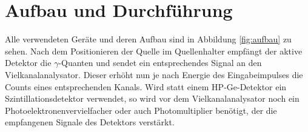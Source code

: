 \section{Aufbau und Durchführung}
\label{sec:aufbau}
\FloatBarrier

	Alle verwendeten Geräte und deren Aufbau sind in Abbildung \ref{fig:aufbau} zu sehen.
	Nach dem Positionieren der Quelle im Quellenhalter empfängt der aktive Detektor die $\gamma$-Quanten und sendet ein entsprechendes Signal an den Vielkanalanalysator.
	Dieser erhöht nun je nach Energie des Eingabeimpulses die Counts eines entsprechenden Kanals.
	Wird statt einem HP-Ge-Detektor ein Szintillationsdetektor verwendet, so wird vor dem Vielkanalanalysator noch ein Photoelektronenvervielfacher oder auch Photomultiplier benötigt, der die empfangenen Signale des Detektors verstärkt.

